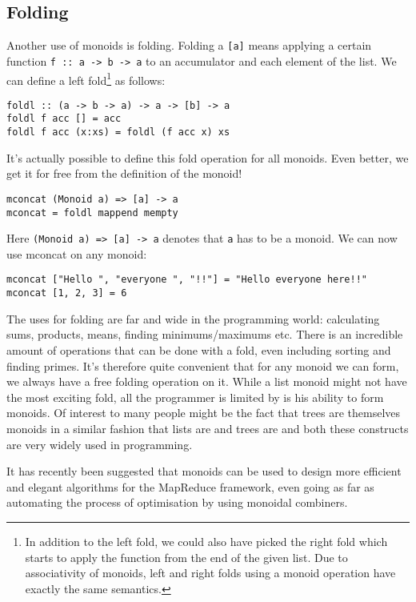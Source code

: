 \documentclass{acm_proc_article-sp}
\begin{document}
\subsection{Folding}
Another use of monoids is folding. Folding a \texttt{[a]} means applying a
certain function \texttt{f :: a -> b -> a} to an accumulator and each element
of the list. We can define a left fold\footnote{In addition to the
  left fold, we could also have picked the right fold which starts to
  apply the function from the end of the given list. Due to
  associativity of monoids, left and right folds using a monoid
  operation have exactly the same semantics.} as follows:
\begin{lstlisting}
foldl :: (a -> b -> a) -> a -> [b] -> a
foldl f acc [] = acc
foldl f acc (x:xs) = foldl (f acc x) xs
\end{lstlisting}
It's actually possible to define this fold operation for all
monoids. Even better, we get it for free from the definition of the
monoid!
\begin{lstlisting}
mconcat (Monoid a) => [a] -> a
mconcat = foldl mappend mempty
\end{lstlisting}
Here
\texttt{(Monoid a) => [a] -> a} denotes that \texttt{a} has to be a
monoid. We can now use mconcat on any monoid:
\begin{lstlisting}
mconcat ["Hello ", "everyone ", "!!"] = "Hello everyone here!!"
mconcat [1, 2, 3] = 6
\end{lstlisting}
The uses for folding are far and wide in the programming world:
calculating sums, products, means, finding minimums/maximums etc. There is an
incredible amount of operations that can be done with a fold, even
including sorting and finding primes\cite{haskell:fold}. It's
therefore quite convenient that for any monoid we can form, we always
have a free folding operation on it. While a list monoid might not
have the most exciting fold, all the programmer is limited by is his
ability to form monoids. Of interest to many people might be the fact
that trees are themselves monoids in a similar fashion that lists are
and trees are and both these constructs are very widely used in programming.

It has recently been suggested that monoids can be used to design more
efficient and elegant algorithms for the MapReduce framework, even
going as far as automating the process of optimisation by using
monoidal combiners.\cite{Lin:monodify}
\end{document}
